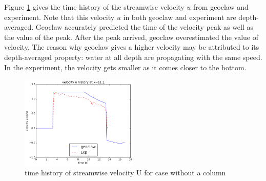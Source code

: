 \documentclass[11pt]{article}
\begin{document}
Figure \ref{fig:velocityU_nocolumn} gives the time history of the streamwise velocity $u$ from geoclaw and experiment. 
Note that this velocity $u$ in both geoclaw and experiment are depth-averaged. 
Geoclaw accurately predicted the time of the velocity peak as well as the value of the peak. 
After the peak arrived, geoclaw overestimated the value of velocity.
The reason why geoclaw gives a higher velocity may be attributed to its depth-averaged property: water at all depth are propagating with the same speed. In the experiment, the velocity gets smaller as it comes closer to the bottom. 
\begin{figure}[h!]
    \centering
    \includegraphics[width=0.5\textwidth]{./plots/velocityU_nocolumn}
    \caption{time history of streamwise velocity U for case without a column}
    \label{fig:velocityU_nocolumn}
\end{figure}
\end{document}
